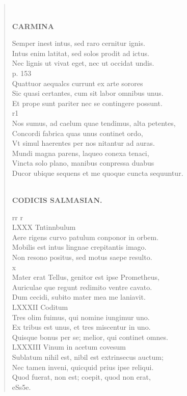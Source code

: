 \documentclass[11pt, a4paper]{report}
\begin{document}
\begin{verse}
        ﻿\pagebreak 
    \begin{center} \textbf{CARMINA} \end{center} \marginpar{[20]} Semper inest intus, sed raro cernitur ignis. \\ Intus enim latitat, sed solos prodit ad ictus. \\ Nec lignis ut vivat eget, nec ut occidat undis. \\ p. 153 \\ Quattuor aequalcs currunt ex arte sorores \\ Sic quasi certantes, cum sit labor omnibus unus. \\ Et prope sunt pariter nec se contingere possunt. \\ r1 \\ Nos sumus, ad caelum quae tendimus, alta petentes, \\ Concordi fabrica quas unus continet ordo, \\ Vt simul haerentes per nos nitantur ad auras. \\ Mundi magna parens, laqueo conexa tenaci, \\ Vincta solo plano, manibus conpressa duabus \\ Ducor ubique sequens et me quoque cuncta sequuntur. \\ 
        ﻿\pagebreak 
    \begin{center} \textbf{CODICIS SALMASIAN.} \end{center} \marginpar{[241]} rr r \\ LXXX Tntinnbulum \\ Aere rigens curvo patulum conponor in orbem. \\ Mobilis est intus lingnae crepitantis imago. \\ Non resono positus, sed motus saepe resulto. \\ x \\ Mater erat Tellus, genitor est ipse Prometheus, \\ Auriculae \lbrack que \rbrack  regunt redimito ventre cavato. \\ Dum cecidi, subito mater mea me laniavit. \\ LXXXII Coditum \\ Tres olim fuimus, qui nomine iungimur uno. \\ Ex tribus est unus, et tres miscentur in uno. \\ Quisque bonus per se; melior, qui continet omnes. \\ LXXXIII Vinum in acetum covesum \\ Sublatum nihil est, nibil est extrinsecus auctum; \\ Nec tamen inveni, quicquid prius ipse reliqui. \\ Quod fuerat, non est; coepit, quod non erat, \\ eSs5e. \\ 

\end{verse}
\end{document}
